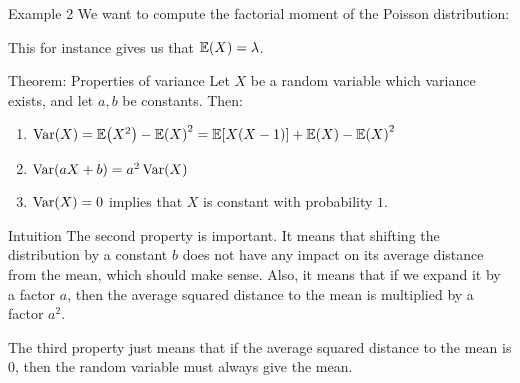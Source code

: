 \documentclass[a4paper]{article}
\begin{document}
\begin{parag}{Example 2}
    We want to compute the factorial moment of the Poisson distribution: 
    
    This for instance gives us that $\exval\left(X\right) = \lambda$.
\end{parag}


\begin{parag}{Theorem: Properties of variance}
    Let $X$ be a random variable which variance exists, and let $a, b$ be constants. Then:
    \begin{enumerate}
        \item $\Var\left(X\right) = \exval\left(X^2\right) - \exval\left(X\right)^2 = \exval\left[X\left(X - 1\right)\right] + \exval\left(X\right) - \exval\left(X\right)^2 $
        \item $\Var\left(aX + b\right) = a ^2 \Var\left(X\right)$
        \item $\Var\left(X\right) = 0$ implies that $X$ is constant with probability $1$.
    \end{enumerate}
    
    \begin{subparag}{Intuition}
        The second property is important. It means that shifting the distribution by a constant $b$ does not have any impact on its average distance from the mean, which should make sense. Also, it means that if we expand it by a factor $a$, then the average squared distance to the mean is multiplied by a factor $a ^2$.

        The third property just means that if the average squared distance to the mean is 0, then the random variable must always give the mean.
    \end{subparag}
\end{parag}
\end{document}

